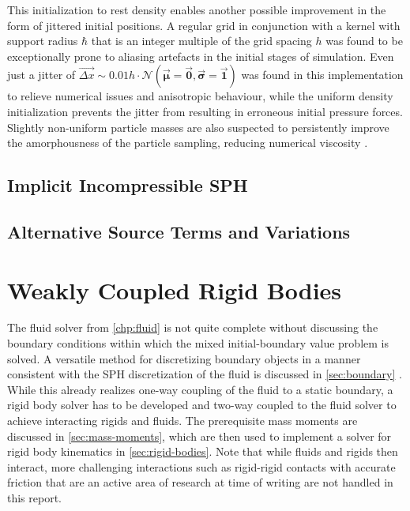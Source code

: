\documentclass[oneside, a4paper]{book}
\newcommand\vek[1]{\vec{\bm{#1}}}
\newcommand\br[1]{\left(#1\right)}
\begin{document}
\begin{itemize}
      This initialization to rest density enables another possible improvement in the form of jittered initial positions. A regular grid in conjunction with a kernel with support radius $\hbar$ that is an integer multiple of the grid spacing $h$ was found to be exceptionally prone to aliasing artefacts in the initial stages of simulation. Even just a jitter of $\overrightarrow{\Delta x} \sim 0.01h\cdot\mathcal{N}\br{\vek{\mu}=\vek{0}, \vek{\sigma}=\vek{1}}$ was found in this implementation to relieve numerical issues and anisotropic behaviour, while the uniform density initialization prevents the jitter from resulting in erroneous initial pressure forces. Slightly non-uniform particle masses are also suspected to persistently improve the amorphousness of the particle sampling, reducing numerical viscosity \autocite{labcourse}.
    \end{itemize}
   

    \section{Implicit Incompressible SPH}\label{sec:iisph}
    

    \newpage
    \section{Alternative Source Terms and Variations}\label{sec:alternative-source-terms}
\chapter{Weakly Coupled Rigid Bodies}\label{chp:rigid}
    The fluid solver from \autoref{chp:fluid} is not quite complete without discussing the boundary conditions within which the mixed initial-boundary value problem is solved\autocite{tutorial2019}. A versatile method for discretizing boundary objects in a manner consistent with the SPH discretization of the fluid is discussed in \autoref{sec:boundary} \autocite{versatile-boundary-akinci}. While this already realizes one-way coupling of the fluid to a static boundary, a rigid body solver has to be developed and two-way coupled to the fluid solver to achieve interacting rigids and fluids. The prerequisite mass moments are discussed in \autoref{sec:mass-moments}, which are then used to implement a solver for rigid body kinematics in \autoref{sec:rigid-bodies}. Note that while fluids and rigids then interact, more challenging interactions such as rigid-rigid contacts with accurate friction that are an active area of research at time of writing \autocite{monolithic-rigids-timo} are not handled in this report.
\end{document}
